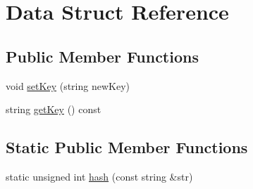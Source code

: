 \hypertarget{struct_data}{\section{Data Struct Reference}
\label{struct_data}
}
\subsection*{Public Member Functions}
\begin{DoxyCompactItemize}
\item 
void \hyperlink{struct_data_a59bc7ecf5b7d3d4f358f87c87f62bcc3}{set\-Key} (string new\-Key)
\item 
string \hyperlink{struct_data_aeca168b691885c7eb893f01ed54dabd9}{get\-Key} () const 
\end{DoxyCompactItemize}
\subsection*{Static Public Member Functions}
\begin{DoxyCompactItemize}
\item 
static unsigned int \hyperlink{struct_data_af98f6d2d78472b7c6f5ab7d7c9357d99}{hash} (const string \&str)
\end{DoxyCompactItemize}


